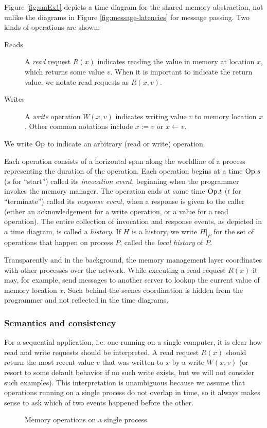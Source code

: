 \documentclass[]             %
{NASA}                       %
\theoremstyle{definition}
\begin{document}
Figure \ref{fig:smEx1} depicts a time diagram for the shared memory
abstraction, not unlike the diagrams in Figure
\ref{fig:message-latencies} for message passing. Two kinds of
operations are shown:
\begin{description}
\item[Reads] A \emph{read} request $R(x)$ indicates reading the value
  in memory at location $x$, which returns some value $v$. When it is
  important to indicate the return value, we notate read requests as
  $R(x, v)$.
\item[Writes] A \emph{write} operation $W(x, v)$ indicates writing
  value $v$ to memory location $x$. Other common notations include
  $x := v$ or $x \leftarrow v$.
\end{description}
We write $\mathrm{Op}$ to indicate an arbitrary (read or write)
operation.

Each operation consists of a horizontal span along the worldline of a
process representing the duration of the operation. Each operation
begins at a time $\mathrm{Op}.s$ ($s$ for ``start'') called its
\emph{invocation event}, beginning when the programmer invokes the
memory manager. The operation ends at some time $\mathrm{Op}.t$ ($t$ for
``terminate'') called its \emph{response event}, when a response is
given to the caller (either an acknowledgement for a write operation,
or a value for a read operation). The entire collection of invocation
and response events, as depicted in a time diagram, is called a
\emph{history}. If $H$ is a history, we write $H|_P$ for the set of
operations that happen on process $P$, called the \emph{local history}
of $P$.

Transparently and in the background, the memory management layer
coordinates with other processes over the network. While executing a
read request $R(x)$ it may, for example, send messages to another
server to lookup the current value of memory location $x$. Such
behind-the-scenes coordination is hidden from the programmer and not
reflected in the time diagrams.

\subsubsection{Semantics and consistency}

For a sequential application, i.e. one running on a single computer,
it is clear how read and write requests should be interpreted. A read
request $R(x)$ should return the most recent value $v$ that was
written to $x$ by a write $W(x, v)$ (or resort to some default
behavior if no such write exists, but we will not consider such
examples). This interpretation is unambiguous because we assume that
operations running on a single process do not overlap in time, so it
always makes sense to ask which of two events happened before the
other.
\begin{figure}
  
  \caption{Memory operations on a single process}
  \label{fig:smEx0}
\end{figure}
\end{document}
